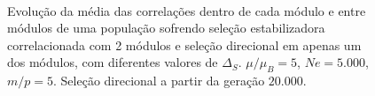 \begin{figure}[htbp]
   \vspace{-18pt}
   \vspace{11pt}
   \\
   \caption{ Evolução da média das correlações dentro de cada módulo
      e entre módulos de uma população sofrendo seleção estabilizadora
      correlacionada com 2 módulos e seleção direcional em apenas um dos
   módulos, com diferentes valores de $\Delta_S$. $\mu/\mu_B = 5$, $Ne =
   5.000$, $m/p=5$. Seleção direcional a partir da geração $20.000$.}
   \label{CoAVG}
\end{figure}

